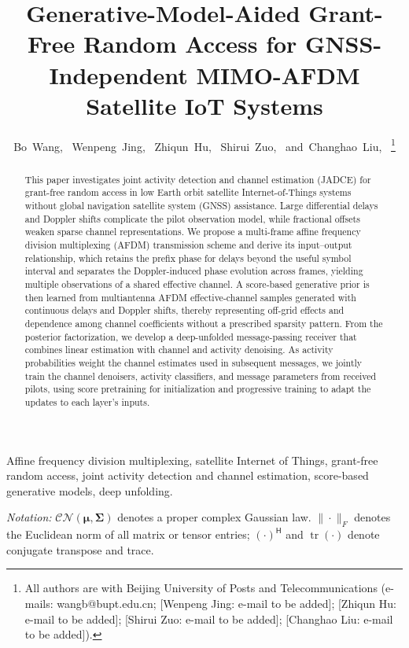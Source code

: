 \documentclass[10pt,journal,letterpaper]{IEEEtran}
\title{Generative-Model-Aided Grant-Free Random Access for GNSS-Independent MIMO-AFDM Satellite IoT Systems}
\author{Bo~Wang,~\IEEEmembership{Student~Member,~IEEE,}
Wenpeng~Jing,~\IEEEmembership{Senior~Member,~IEEE,}
Zhiqun~Hu,~\IEEEmembership{Senior~Member,~IEEE,}
Shirui~Zuo,~\IEEEmembership{Student~Member,~IEEE,}
and~Changhao~Liu,~\IEEEmembership{Student~Member,~IEEE}%
\thanks{All authors are with Beijing University of Posts and
Telecommunications (e-mails: wangb@bupt.edu.cn;
[Wenpeng Jing: e-mail to be added]; [Zhiqun Hu: e-mail to be added];
[Shirui Zuo: e-mail to be added]; [Changhao Liu: e-mail to be added]).}}
\newcommand{\CN}{\mathcal{CN}}
\newcommand{\tr}{\operatorname{tr}}
\begin{document}
\maketitle
\begin{abstract}
This paper investigates joint activity detection and channel estimation
(JADCE) for grant-free random access in low Earth orbit satellite
Internet-of-Things systems without global navigation satellite system
(GNSS) assistance. Large differential delays and Doppler shifts
complicate the pilot observation model, while fractional offsets weaken
sparse channel representations. We propose a multi-frame affine frequency
division multiplexing (AFDM) transmission scheme and derive its
input--output relationship, which retains the prefix phase for delays
beyond the useful symbol interval and separates the Doppler-induced
phase evolution across frames, yielding multiple observations of a
shared effective channel. A score-based generative prior is then
learned from multiantenna AFDM effective-channel samples generated with
continuous delays and Doppler shifts, thereby representing off-grid
effects and dependence among channel coefficients without a prescribed
sparsity pattern. From the posterior factorization, we develop a
deep-unfolded message-passing receiver that combines linear estimation
with channel and activity denoising. As activity probabilities weight
the channel estimates used in subsequent messages, we jointly train
the channel denoisers, activity classifiers, and message parameters
from received pilots, using score pretraining for initialization and
progressive training to adapt the updates to each layer's inputs.
\end{abstract}
\begin{IEEEkeywords}
Affine frequency division multiplexing, satellite Internet of Things,
grant-free random access, joint activity detection and channel estimation,
score-based generative models, deep unfolding.
\end{IEEEkeywords}



\noindent\textit{Notation:} $\CN(\bm\mu,\bm\Sigma)$ denotes a proper complex Gaussian law.
$\|\cdot\|_F$ denotes the Euclidean norm of all matrix or tensor entries;
$(\cdot)^{\mathsf H}$ and $\tr(\cdot)$ denote conjugate transpose and trace.





% 
% 

\appendices
{}




\end{document}
